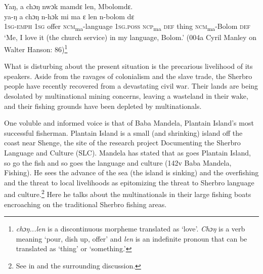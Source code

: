 \clearpage

\ea \label{ex:1} Yaŋ, a chɔŋ nwɔk mamdɛ len, Mbolomdɛ.\\
    \gll ya-ŋ      a    chɔŋ  n-hɔk          mi ma    ɛ    len    n-bolom    dɛ\\
    \textsc{1sg-emph}  \textsc{1sg}  offer  \textsc{ncm}\textsubscript{ma}{}-language  \textsc{1sg.poss} \textsc{ncp}\textsubscript{ma}  \textsc{def}  thing    \textsc{ncm}\textsubscript{ma}{}-Bolom  \textsc{def}\\
    \glt ‘Me, I love it (the church service) in my language, Bolom.' (004a Cyril Manley on Walter Hanson: 86)\footnote{\textit{chɔŋ...len} is a discontinuous morpheme translated as ‘love'. \textit{Chɔŋ} is a verb meaning ‘pour, dish up, offer' and \textit{len} is an indefinite pronoun that can be translated as ‘thing' or ‘something.'}
\z

What is disturbing about the present situation is the precarious livelihood of its speakers. Aside from the ravages of colonialism and the slave trade, the Sherbro people have recently recovered from a devastating civil war. Their lands are being desolated by multinational mining concerns, leaving a wasteland in their wake, and their fishing grounds have been depleted by multinationals.

One voluble and informed voice is that of Baba Mandela, Plantain Island's most successful fisherman. Plantain Island is a small (and shrinking) island off the coast near Shenge, the site of the research project Documenting the Sherbro Language and Culture (SLC). Mandela has stated that as goes Plantain Island, so go the fish and so goes the language and culture (142v Baba Mandela, Fishing). He sees the advance of the sea (the island is sinking) and the overfishing and the threat to local livelihoods as epitomizing the threat to Sherbro language and culture.\footnote{See  in  and the surrounding discussion.} Here he talks about the multinationals in their large fishing boats encroaching on the traditional Sherbro fishing areas.

